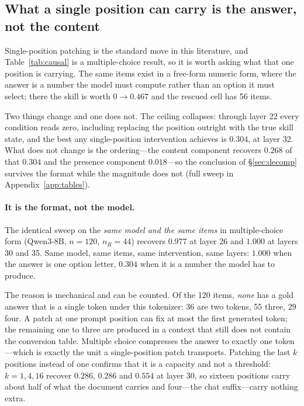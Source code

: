 \documentclass{article}
\begin{document}
\subsection{What a single position can carry is the answer, not the content}


Single-position patching is the standard move in this literature, and
Table~\ref{tab:causal} is a multiple-choice result, so it is worth asking what
that one position is carrying. The same items exist in a free-form numeric form,
where the answer is a number the model must compute rather than an option it
must select; there the skill is worth $0 \to 0.467$ and the rescued cell has 56
items.

Two things change and one does not. The ceiling collapses: through layer 22
every condition reads zero, including replacing the position outright with the
true skill state, and the best any single-position intervention achieves is
$0.304$, at layer 32. What does not change is the ordering---the content
component recovers $0.268$ of that $0.304$ and the presence component
$0.018$---so the conclusion of \S\ref{sec:decomp} survives the format while the
magnitude does not (full sweep in Appendix~\ref{app:tables}).

\paragraph{It is the format, not the model.} The identical sweep on the
\emph{same model and the same items} in multiple-choice form (Qwen3-8B,
$n=120$, $n_R=44$) recovers $0.977$ at layer 26 and $1.000$ at layers 30 and 35.
Same model, same items, same intervention, same layers: $1.000$ when the answer
is one option letter, $0.304$ when it is a number the model has to produce.

The reason is mechanical and can be counted. Of the 120 items, \emph{none} has a
gold answer that is a single token under this tokenizer: 36 are two tokens, 55
three, 29 four. A patch at one prompt position can fix at most the first
generated token; the remaining one to three are produced in a context that still
does not contain the conversion table. Multiple choice compresses the answer to
exactly one token---which is exactly the unit a single-position patch
transports. Patching the last $k$ positions instead of one confirms that it is a
capacity and not a threshold: $k = 1, 4, 16$ recover $0.286$, $0.286$ and
$0.554$ at layer 30, so sixteen positions carry about half of what the document
carries and four---the chat suffix---carry nothing extra.
\end{document}
